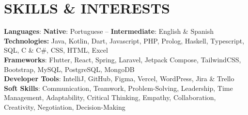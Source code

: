 \documentclass[letterpaper,11pt]{article}
\begin{document}
\section{SKILLS \& INTERESTS}
\begin{itemize}[leftmargin=0.15in, label={}]
\small{\item{
\vspace{1mm}
\textbf{Languages}{: \textbf{Native}: Portuguese -- \textbf{Intermediate}: English \& Spanish} \\
\vspace{1mm}
\textbf{Technologies:} {Java, Kotlin, Dart, Javascript, PHP, Prolog, Haskell, Typescript, SQL, C \& C\#, CSS, HTML, Excel} \\
\vspace{1mm}
\textbf{Frameworks}{: Flutter, React, Spring, Laravel, Jetpack Compose, TailwindCSS, Bootstrap, MySQL, PostgreSQL, MongoDB} \\
\vspace{1mm}
\textbf{Developer Tools}{: IntelliJ, GitHub, Figma, Vercel, WordPress, Jira \& Trello} \\
\vspace{1mm}
\textbf{Soft Skills}{: Communication, Teamwork, Problem-Solving, Leadership, Time Management, Adaptability, Critical Thinking, Empathy, Collaboration, Creativity, Negotiation, Decision-Making} \\
\vspace{1mm}
}}
\end{itemize}
\end{document}
